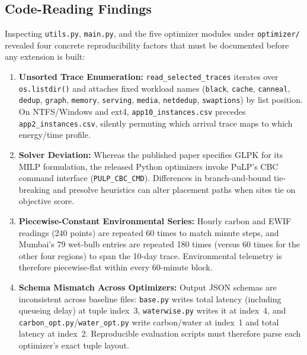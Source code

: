 \documentclass[conference]{IEEEtran}
\begin{document}
\subsection{Code-Reading Findings}
Inspecting \texttt{utils.py}, \texttt{main.py}, and the five optimizer modules under \texttt{optimizer/} revealed four concrete reproducibility factors that must be documented before any extension is built:
\begin{enumerate}[leftmargin=*]
    \item \textbf{Unsorted Trace Enumeration:} \texttt{read\_selected\_traces} iterates over \texttt{os.listdir()} and attaches fixed workload names (\texttt{black}, \texttt{cache}, \texttt{canneal}, \texttt{dedup}, \texttt{graph}, \texttt{memory}, \texttt{serving}, \texttt{media}, \texttt{netdedup}, \texttt{swaptions}) by list position. On NTFS/Windows and ext4, \texttt{app10\_instances.csv} precedes \texttt{app2\_instances.csv}, silently permuting which arrival trace maps to which energy/time profile.
    \item \textbf{Solver Deviation:} Whereas the published paper specifies GLPK for its MILP formulation, the released Python optimizers invoke PuLP's CBC command interface (\texttt{PULP\_CBC\_CMD}). Differences in branch-and-bound tie-breaking and presolve heuristics can alter placement paths when sites tie on objective score.
    \item \textbf{Piecewise-Constant Environmental Series:} Hourly carbon and EWIF readings (240 points) are repeated 60 times to match minute steps, and Mumbai's 79 wet-bulb entries are repeated 180 times (versus 60 times for the other four regions) to span the 10-day trace. Environmental telemetry is therefore piecewise-flat within every 60-minute block.
    \item \textbf{Schema Mismatch Across Optimizers:} Output JSON schemas are inconsistent across baseline files: \texttt{base.py} writes total latency (including queueing delay) at tuple index~3, \texttt{waterwise.py} writes it at index~4, and \texttt{carbon\_opt.py}/\texttt{water\_opt.py} write carbon/water at index~1 and total latency at index~2. Reproducible evaluation scripts must therefore parse each optimizer's exact tuple layout.
\end{enumerate}
\end{document}
